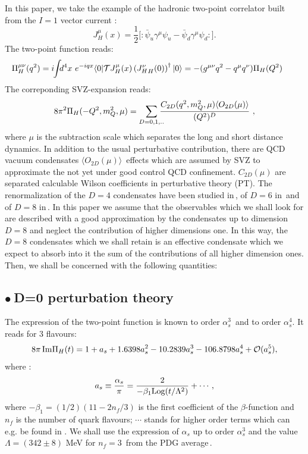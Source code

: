 \documentclass[review]{elsarticle}
\def\beq{\begin{equation}}
\def\eeq{\end{equation}}
\def\ga{\left(}
\def\dr{\right)}
\def\la{\langle}
\def\ra{\rangle}
\def\b{$\bullet~$}
\begin{document}
 In this paper, we take  the example of the hadronic two-point correlator built from the $I=1$  vector current :
\beq
 J^\mu_H(x)=\frac{1}{2}{[}: \bar\psi_u\gamma^\mu\psi_u-\bar\psi_d\gamma^\mu\psi_d:{]}.
 \eeq
The two-point function reads: 
\beq
\hspace*{-0.6cm} \Pi^{\mu\nu}_H(q^2)=i\hspace*{-0.1cm}\int \hspace*{-0.15cm}d^4x ~e^{-iqx}\la 0\vert {\cal T} {J^\mu_H}(x)\ga {J^\nu_H}_H(0)\dr^\dagger \vert 0\ra=-(g^{\mu\nu}q^2-q^\mu q^\nu)\Pi_H(Q^2)
 \label{eq:2-point}
 \eeq
The correponding SVZ-expansion reads:
\beq
8\pi^2\Pi_H(-Q^2,m_Q^2,\mu)=\sum_{D=0,1,..}\hspace*{-0.25cm}\frac{C_{2D}(q^2,m_Q^2,\mu)\la O_{2D}(\mu)\ra}{(Q^2)^{D}}~, 
\label{eq:ope}
\eeq
where $\mu$ is the subtraction scale which separates the long and short distance dynamics. In addition to the usual perturbative contribution, there are QCD vacuum condensates $\la O_{2D}(\mu)\ra$\ effects which are assumed by SVZ to approximate  the not yet under good control QCD confinement.  $C_{2D}(\mu)$ are separated calculable Wilson coefficients in perturbative theory (PT).  The renormalization of the $D=4$ condensates have been studied in\,\cite{TARRACH,ESPRIU}, of $D=6$ in\,\cite{SNTARRACH} and of $D=8$ in\,\cite{BAGAN}.  In this paper we assume that the observables which we shall look for are described with a good approximation by the condensates up to dimension $D=8$ and neglect the contribution of higher dimensions one. In this way, the $D=8$ condensates which we shall retain is an effective condensate which we expect to absorb into it the sum of the contributions of all higher dimension ones. Then, we shall be concerned with the following quantities:
\subsection*{\b D=0 perturbation theory}
The expression of the two-point function is known to order $\alpha_s^3$\,\cite{LARIN} and to order $\alpha_s^4$\cite{CHET4}. It reads for 3 flavours:
\beq
8{\pi}\,{\rm Im}\Pi_H(t)=  1+a_s+1.6398a_s^2-10.2839a_s^3-106.8798a_s^4+{\cal O}(a_s^5),
\label{eq:pt}
\eeq
where : 
\beq
a_s\equiv \frac{\alpha_s}{\pi}=\frac{2}{-\beta_1{\rm Log} (t/\Lambda^2)}+\cdots,
\eeq 
where $-\beta_1=(1/2)(11-2n_f/3)$ is the first coefficient of the $\beta$-function and $n_f$ is the number of quark flavours;  $\cdots$ stands for higher order terms which can e.g. be found in \cite{SNB2}. We shall use the expression of $\alpha_s$ up to order $\alpha_s^3$ and the value $\Lambda =(342\pm 8)$ MeV  for  $n_f=3$\:\, from the PDG average\,\cite{PDG}.
\end{document}
